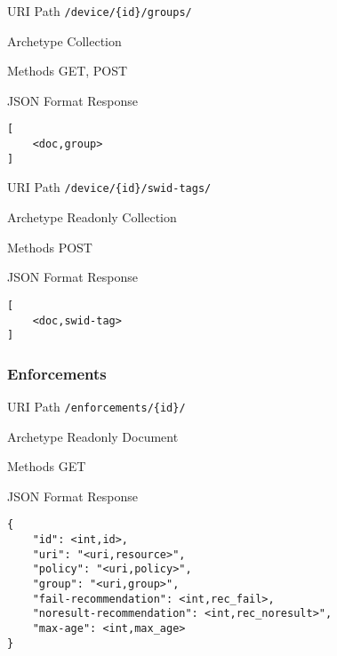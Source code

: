 \documentclass[10pt,a4paper]{scrartcl}
\begin{document}
\begin{mdframed}[style=def]
\begin{description*}
	\item[URI Path] \texttt{/device/\{id\}/groups/}
	\item[Archetype] Collection 
	\item[Methods] GET, POST
	\item[JSON Format Response] \hfill
\begin{lstlisting}
[
	<doc,group>
]
\end{lstlisting}
\end{description*}
\end{mdframed}

\begin{mdframed}[style=def]
\begin{description*}
	\item[URI Path] \texttt{/device/\{id\}/swid-tags/}
	\item[Archetype] Readonly Collection 
	\item[Methods] POST
	\item[JSON Format Response] \hfill
\begin{lstlisting}
[
	<doc,swid-tag>
]
\end{lstlisting}
\end{description*}
\end{mdframed}


\pagebreak
\subsubsection{Enforcements}
\begin{mdframed}[style=def]
\begin{description*}
	\item[URI Path] \texttt{/enforcements/\{id\}/}
	\item[Archetype] Readonly Document
	\item[Methods] GET
	\item[JSON Format Response] \hfill
\begin{lstlisting}
{
	"id": <int,id>,
	"uri": "<uri,resource>",
	"policy": "<uri,policy>",
	"group": "<uri,group>",
	"fail-recommendation": <int,rec_fail>,
	"noresult-recommendation": <int,rec_noresult>", 
	"max-age": <int,max_age>
}
\end{lstlisting}
\end{description*}
\end{mdframed}
\end{document}
